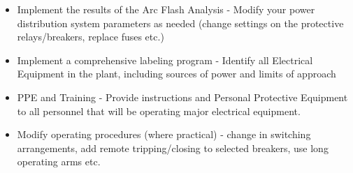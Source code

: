 \begin{itemize}
\item	Implement the results of the Arc Flash Analysis - Modify your power distribution system parameters as needed (change settings on the protective relays/breakers, replace fuses etc.)
\\
\item	Implement a comprehensive labeling program - Identify all Electrical Equipment in the plant, including sources of power and limits of approach  
\\
\item	PPE and Training - Provide instructions and Personal Protective Equipment to all personnel that will be operating major electrical equipment.
\\
\item	Modify operating procedures (where practical) - change in switching arrangements, add remote tripping/closing to selected breakers, use long operating arms etc.
\end{itemize}